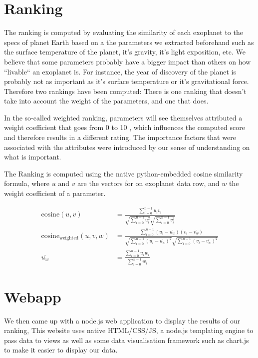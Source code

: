 \documentclass[12p]{article}
\begin{document}

\section{Ranking}
The ranking is computed by evaluating the similarity of each exoplanet to the specs of planet Earth based on a the parameters we extracted beforehand such as the surface temperature of the planet, it’s gravity, it’s light exposition, etc. We believe that some parameters probably have a bigger impact than others on how ``livable`` an exoplanet is. For instance, the year of discovery of the planet is probably not as important as it's surface temperature or it's gravitational force. Therefore two rankings have been computed: There is one ranking that doesn't take into account the weight of the parameters, and one that does.

In the so-called weighted ranking, parameters will see themselves attributed a weight coefficient that goes from 0 to 10 , which influences the computed score and therefore results in a different rating. The importance factors that were associated with the attributes were introduced by our sense of understanding on what is important.

The Ranking is computed using the native python-embedded cosine similarity formula, where $u$ and $v$ are the vectors for on exoplanet data row, and $w$ the weight coefficient of a parameter.

\begin{align}
\text{cosine}(u,v) &= \frac{\sum_{i=0}^{n-1} u_iv_i  }{ \sqrt{\sum_{i=0}^{n-1} u_i^2  } \sqrt{\sum_{i=0}^{n-1} v_i^2  }} \label{eq:cosine}\\
\text{cosine}_{\text{weighted}}(u,v,w) &= \frac{\sum_{i=0}^{n-1} (u_i-\overline{u_w})(v_i-\overline{v_w})  }{ \sqrt{\sum_{i=0}^{n-1} (u_i-\overline{u_w})^2  } \sqrt{\sum_{i=0}^{n-1} (v_i-\overline{v_w})^2  }} \label{eq:cosine_weighted} \\
\overline{u_w} &= \frac{ \sum_{i=0}^{n-1} u_iw_i }{ \sum_{i=0}^{n-1} w_i } \label{eq:weighted_mean}
\end{align}


\section{Webapp}
We then came up with a node.js web application to display the results of our ranking, This website uses native HTML/CSS/JS, a node.js templating engine to pass data to views as well as some data visualisation framework such as chart.js to make it easier to display our data.
\end{document}
